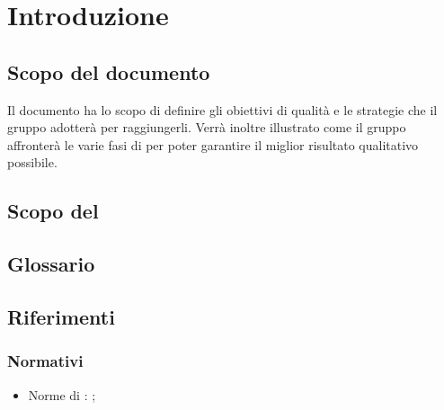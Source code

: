 \documentclass[PianoDiQualifica.tex]{subfiles}
\begin{document}
\section{Introduzione}
	\subsection{Scopo del documento}
		Il documento ha lo scopo di definire gli obiettivi di qualità e le strategie che il gruppo \GRUPPO{}
		adotterà per raggiungerli. Verrà inoltre illustrato come il gruppo affronterà le varie fasi di 
		per poter garantire il miglior risultato qualitativo possibile.
	\subsection{Scopo del }
		\SCOPO
	\subsection{Glossario}
		\GLOSSARIO
	\subsection{Riferimenti}
		\subsubsection{Normativi}
			\begin{itemize}
				\item Norme di : \NPdocRR{};
			\end{itemize}
\end{document}
